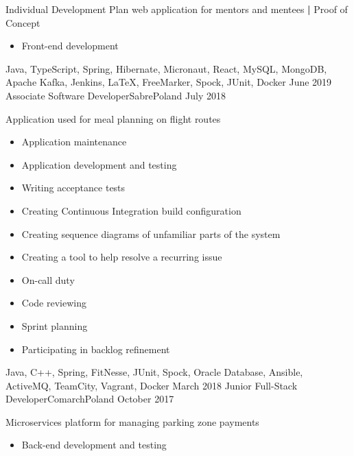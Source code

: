 \begin{experiences}
{\begin{itemize}
                        \end{itemize}
                        Individual Development Plan web application for mentors and mentees \textbf{|} \small{Proof of Concept}\normalsize
                        \begin{itemize}
                            \item Front-end development
                        \end{itemize}
                    }
                    {Java, TypeScript, Spring, Hibernate, Micronaut, React, MySQL, MongoDB, Apache Kafka, Jenkins, LaTeX, FreeMarker, Spock, JUnit, Docker}
  \emptySeparator
  \experience
    {June 2019} {Associate Software Developer}{Sabre}{Poland}
    {July 2018}    {
                        Application used for meal planning on flight routes
                        \begin{itemize}
                            \item Application maintenance
                            \item Application development and testing
                            \item Writing acceptance tests
                            \item Creating Continuous Integration build configuration
                            \item Creating sequence diagrams of unfamiliar parts of the system  
                            \item Creating a tool to help resolve a  recurring issue
                            \item On-call duty
                            \item Code reviewing
                            \item Sprint planning
                            \item Participating in backlog refinement
                        \end{itemize}
                    }
                    {Java, C++, Spring, FitNesse, JUnit, Spock, Oracle Database, Ansible, ActiveMQ, TeamCity, Vagrant, Docker}
  \emptySeparator
  \experience
    {March 2018}     {Junior Full-Stack Developer}{Comarch}{Poland}
    {October 2017}    {
                        Microservices platform for managing parking zone payments
                        \begin{itemize}
                            \item Back-end development and testing

\end{itemize}}
\end{experiences}
